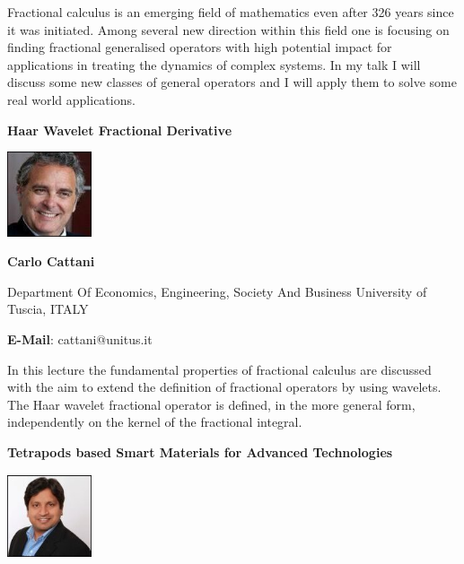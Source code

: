 \documentclass[twoside,11pt]{amsart}
\begin{document}
\vskip 8mm
Fractional calculus is an emerging field of mathematics even after 326 years since it was initiated. Among several new direction within this field one is focusing on finding fractional  generalised operators with high potential impact for applications in treating the dynamics of complex systems. In my talk I will discuss some new classes of general operators and I will apply them to solve some real world applications.
\vskip 5mm

\newpage



\vskip 10mm
\begin{center}\bf\LARGE
Haar Wavelet Fractional Derivative
\end{center}
\vskip 5mm
\begin{center}
\includegraphics[width=2.5cm, height=2.5cm,keepaspectratio=false]{CC2.jpg}
\end{center}
\vskip 2mm
\centerline{\textbf{ Carlo Cattani }}
\vskip 2mm
\begin{flushleft}
Department Of Economics, Engineering, Society And Business University of Tuscia, ITALY
\end{flushleft}
\vskip 2mm
\begin{flushleft}
\textbf{E-Mail}: cattani@unitus.it
\end{flushleft}
\vskip 8mm
In this lecture the fundamental properties of fractional calculus are discussed with the aim to extend the definition of fractional operators by using wavelets. The Haar wavelet fractional operator is defined, in the more general form, independently on the kernel of the fractional integral.
\vskip 5mm
\newpage
\vskip10mm
\begin{center}\bf\LARGE
Tetrapods based Smart Materials for Advanced Technologies
\end{center}
\vskip 5mm
\begin{center}
\includegraphics[width=2.5cm, height=2.5cm,keepaspectratio=false]{YKM2.jpg}
\end{center}
\end{document}
